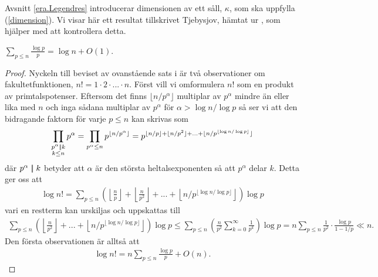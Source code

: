 
Avsnitt \ref{era.Legendres} introducerar dimensionen av ett såll, \(\kappa\), som ska uppfylla (\ref{dimension}). Vi visar här ett resultat tillskrivet Tjebysjov, hämtat ur \cite[Sats 1.4.3]{cojocarumurty}, som hjälper med att kontrollera detta.
\begin{theorem} \label{APDX:THM1.4.3}
    $\sum_{p \leq n} \frac{\log p}{p} = \log n + O(1) $.
\end{theorem}
\begin{proof}
Nyckeln till beviset av ovanstående sats i \cite{cojocarumurty} är två observationer om fakultetfunktionen, \(n! = 1 \cdot 2 \cdot ... \cdot n\). Först vill vi omformulera \(n!\) som en produkt av primtalspotenser. Eftersom det finns \(\lfloor n / p^\alpha \rfloor\) multiplar av \(p^\alpha\) mindre än eller lika med $n$ och inga sådana multiplar av \(p^\alpha\) för \(\alpha > \log n / \log p\) så ser vi att den bidragande faktorn för varje $p \leq n$ kan skrivas som 
\begin{align*}
    \prod_{\substack{p^\alpha \mid\!\mid k \\ k \leq n}} p^\alpha = \prod_{p^\alpha \leq n} p^{\lfloor n/p^{\alpha} \rfloor} = p^{\lfloor n/p \rfloor + \lfloor n/p^2 \rfloor + ... + \lfloor n / p^{\lfloor \log n / \log p \rfloor} \rfloor}
\end{align*}
där \(p^\alpha \mid\!\mid k\) betyder att \(\alpha\) är den största heltalsexponenten så att $p^\alpha$ delar $k$. Detta ger oss att 
\begin{align*}
    \log n! = %
    \sum_{p \leq n} \left(\left\lfloor\frac{n}{p} \right\rfloor + \left\lfloor \frac{n}{p^2} \right\rfloor + ... + \left\lfloor n / p^{\lfloor \log n / \log p \rfloor} \right\rfloor\right) \log p
\end{align*}
vari en restterm kan urskiljas och uppskattas till
\begin{align*}
    \sum_{p \leq n} \left(\left\lfloor \frac{n}{p^2} \right\rfloor + ... + \left\lfloor n / p^{\lfloor \log n / \log p \rfloor} \right\rfloor\right) \log p \leq
    \sum_{p \leq n} \left( \frac{n}{p^2}  \sum_{k=0}^\infty \frac{1}{p^k} \right) \log p
    = n \sum_{p \leq n} \frac{1}{p^2} \cdot \frac{\log p}{1 - 1/p} \ll n.
\end{align*} %
Den första observationen är alltså att
\begin{align} \label{APDX:obser1Thm1.4.3}
    \log n! = n \sum_{p \leq n} \frac{\log p}{p} + O(n).
\end{align}


\end{proof}
